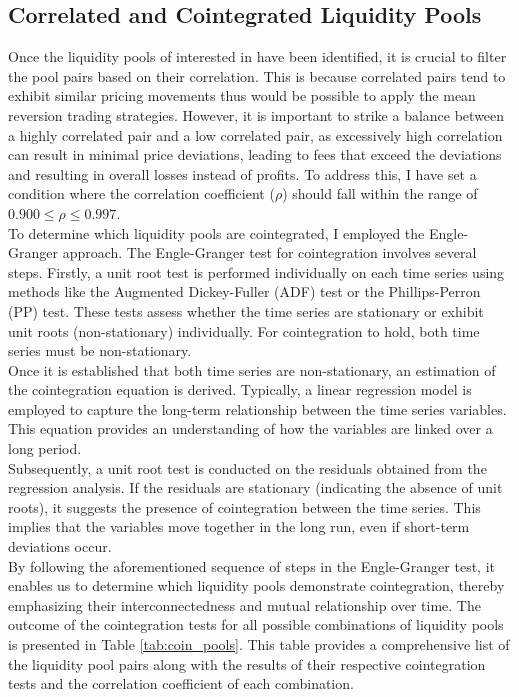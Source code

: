 \subsection{Correlated and Cointegrated Liquidity Pools}
Once the liquidity pools of interested in have been identified, it is crucial to filter the pool pairs based on their correlation. This is because correlated pairs tend to exhibit similar pricing movements thus would be possible to apply the mean reversion trading strategies. However, it is important to strike a balance between a highly correlated pair and a low correlated pair, as excessively high correlation can result in minimal price deviations, leading to fees that exceed the deviations and resulting in overall losses instead of profits. To address this, I have set a condition where the correlation coefficient ($\rho$) should fall within the range of $0.900 \leq \rho \leq 0.997$.
\\[5mm]
To determine which liquidity pools are cointegrated, I employed the Engle-Granger approach. The Engle-Granger test for cointegration involves several steps. Firstly, a unit root test is performed individually on each time series using methods like the Augmented Dickey-Fuller (ADF) test or the Phillips-Perron (PP) test. These tests assess whether the time series are stationary or exhibit unit roots (non-stationary) individually. For cointegration to hold, both time series must be non-stationary.
\\[5mm]
Once it is established that both time series are non-stationary, an estimation of the cointegration equation is derived. Typically, a linear regression model is employed to capture the long-term relationship between the time series variables. This equation provides an understanding of how the variables are linked over a long period.
\\[5mm]
Subsequently, a unit root test is conducted on the residuals obtained from the regression analysis. If the residuals are stationary (indicating the absence of unit roots), it suggests the presence of cointegration between the time series. This implies that the variables move together in the long run, even if short-term deviations occur.
\\[5mm]
By following the aforementioned sequence of steps in the Engle-Granger test, it enables us to determine which liquidity pools demonstrate cointegration, thereby emphasizing their interconnectedness and mutual relationship over time. The outcome of the cointegration tests for all possible combinations of liquidity pools is presented in Table \ref{tab:coin_pools}. This table provides a comprehensive list of the liquidity pool pairs along with the results of their respective cointegration tests and the correlation coefficient of each combination.
